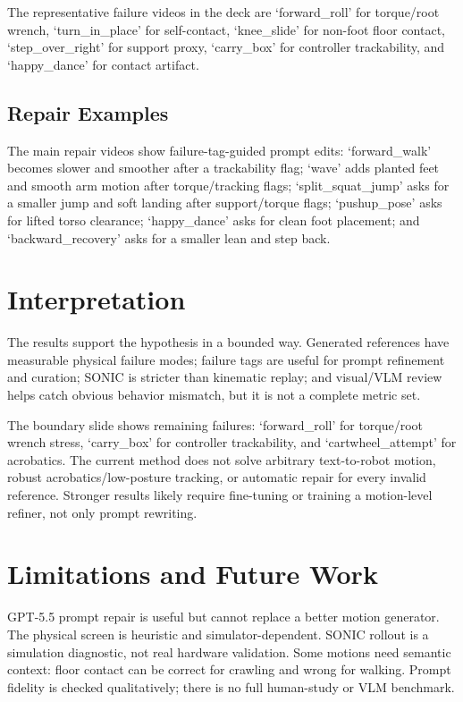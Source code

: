 \documentclass[10pt]{article}
\begin{document}
The representative failure videos in the deck are `forward\_roll' for
torque/root wrench, `turn\_in\_place' for self-contact, `knee\_slide' for
non-foot floor contact, `step\_over\_right' for support proxy, `carry\_box' for
controller trackability, and `happy\_dance' for contact artifact.

\subsection{Repair Examples}

The main repair videos show failure-tag-guided prompt edits:
`forward\_walk' becomes slower and smoother after a trackability flag;
`wave' adds planted feet and smooth arm motion after torque/tracking flags;
`split\_squat\_jump' asks for a smaller jump and soft landing after
support/torque flags; `pushup\_pose' asks for lifted torso clearance;
`happy\_dance' asks for clean foot placement; and `backward\_recovery' asks for
a smaller lean and step back.

\section{Interpretation}

The results support the hypothesis in a bounded way. Generated references have
measurable physical failure modes; failure tags are useful for prompt
refinement and curation; SONIC is stricter than kinematic replay; and
visual/VLM review helps catch obvious behavior mismatch, but it is not a
complete metric set.

The boundary slide shows remaining failures: `forward\_roll' for torque/root
wrench stress, `carry\_box' for controller trackability, and
`cartwheel\_attempt' for acrobatics. The current method does not solve arbitrary
text-to-robot motion, robust acrobatics/low-posture tracking, or automatic
repair for every invalid reference. Stronger results likely require fine-tuning
or training a motion-level refiner, not only prompt rewriting.

\section{Limitations and Future Work}

GPT-5.5 prompt repair is useful but cannot replace a better motion generator.
The physical screen is heuristic and simulator-dependent. SONIC rollout is a
simulation diagnostic, not real hardware validation. Some motions need semantic
context: floor contact can be correct for crawling and wrong for walking.
Prompt fidelity is checked qualitatively; there is no full human-study or VLM
benchmark.
\end{document}
